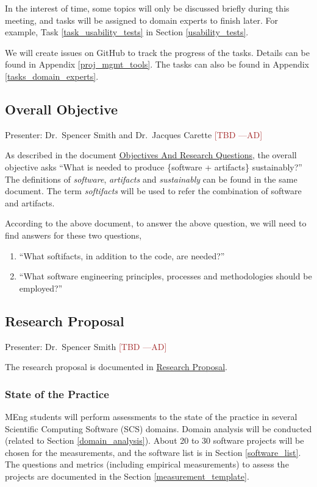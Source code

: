 \documentclass[12pt]{article}
\newcommand{\authornote}[3]{\textcolor{#1}{[#3 ---#2]}}
\newcommand{\authornote}[3]{}
\newcommand{\ad}[1]{\authornote{brown}{AD}{#1}} %
\begin{document}
In the interest of time, some topics will only be discussed briefly during this
meeting, and tasks will be assigned to domain experts to finish later. For
example, Task \ref{task_usability_tests} in Section \ref{usability_tests}.

We will create issues on GitHub to track the progress of the tasks. Details can
be found in Appendix \ref{proj_mgmt_tools}. The tasks can also be found in
Appendix \ref{tasks_domain_experts}.

\subsection{Overall Objective}
\label{overall_objective}
Presenter: Dr.\ Spencer Smith and Dr.\ Jacques Carette \ad{TBD}

As described in the document 
\href{https://github.com/smiths/AIMSS/blob/master/OverallResearchProposal/ObjectivesAndResearchQuestions.pdf}{Objectives
And Research Questions}, the overall objective asks ``What is needed to produce
\{software + artifacts\} sustainably?'' The definitions of \emph{software},
\emph{artifacts} and \emph{sustainably} can be found in the same document. The
term \emph{softifacts} will be used to refer the combination of software and
artifacts.

According to the above document, to answer the above question, we will need to
find answers for these two questions,
\begin{enumerate}
\item ``What softifacts, in addition to the code, are needed?''
\item ``What software engineering principles, processes and methodologies should
be employed?''
\end{enumerate}

\subsection{Research Proposal}
\label{research_proposal}
Presenter: Dr.\ Spencer Smith \ad{TBD}

The research proposal is documented in
\href{https://github.com/smiths/AIMSS/blob/master/OverallResearchProposal/ResearchProposal.pdf}{Research
Proposal}.

\subsubsection{State of the Practice}

MEng students will perform assessments to the state of the practice in several
Scientific Computing Software (SCS) domains. Domain analysis will be conducted
(related to Section \ref{domain_analysis}). About 20 to 30 software projects
will be chosen for the measurements, and the software list is in Section
\ref{software_list}. The questions and metrics (including empirical
measurements) to assess the projects are documented in the Section
\ref{measurement_template}.
\end{document}
